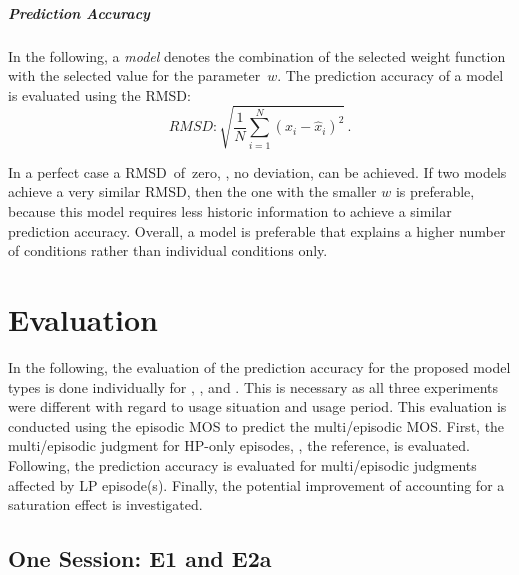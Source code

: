 \subparagraph*{Prediction Accuracy}
In the following, a \emph{model} denotes the combination of the selected weight function with the selected value for the parameter~$\mathit{w}$.
The prediction accuracy of a model is evaluated using the \ac{RMSD}:
\begin{equation}\label{eq:rmsd}
RMSD: \sqrt{\frac{1}{N} \sum\limits_{i=1}^{N}(x_i-\hat{x}_i)^2} \, .
\end{equation}

In a perfect case a \ac{RMSD}~of~zero, \ie, no deviation, can be achieved.
If two models achieve a very similar \ac{RMSD}, then the one with the smaller $\mathit{w}$ is preferable, because this model requires less historic information to achieve a similar prediction accuracy.
Overall, a model is preferable that explains a higher number of conditions rather than individual conditions only.

\section{Evaluation}

In the following, the evaluation of the prediction accuracy for the proposed model types is done individually for , \EIIa{}, and .
This is necessary as all three experiments were different with regard to usage situation and usage period.
This evaluation is conducted using the episodic \ac{MOS} to predict the multi\-/episodic \ac{MOS}.
First, the multi\-/episodic judgment for \ac{HP}-only episodes, \ie, the reference, is evaluated.
Following, the prediction accuracy is evaluated for multi\-/episodic judgments affected by \ac{LP} episode(s).
Finally, the potential improvement of accounting for a saturation effect is investigated.

\subsection{One Session: E1 and E2a}\label{results:prediction}

